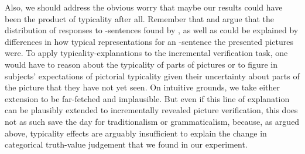 \documentclass[fleqn,reqno,10pt,draft]{article}
\newcommand{\as}{\acro{as}}
\begin{document}
Also, we should address the obvious worry that maybe our results
could have been the product of typicality after all. Remember that
\citet{Tielvan-Tiel2012:Embedded-Scalar} and
\citet{GeurtsTielvan-Tiel2013:Scalar-expressi} argue that the
distribution of responses to \as-sentences found by
\citet{CliftonDube2010:Embedded-Implic}, as well as
\citet{ChemlaSpector2010:Experimental-Ev} could be explained by
differences in how typical representations for an \as-sentence the
presented pictures were. To apply typicality-explanations to the
incremental verification task, one would have to reason about the
typicality of parts of pictures or to figure in subjects' expectations
of pictorial typicality given their uncertainty about parts of the
picture that they have not yet seen. On intuitive grounds, we take
either extension to be far-fetched and implausible. But even if this
line of explanation can be plausibly extended to incrementally
revealed picture verification, this does not as such save the day for
traditionalism or grammaticalism, because, as argued above, typicality
effects are arguably insufficient to explain the change in categorical
truth-value judgement that we found in our experiment.
\end{document}
